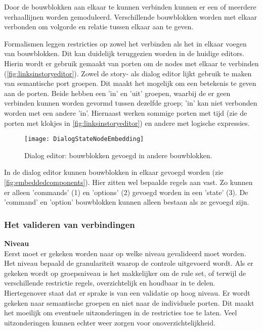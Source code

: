 Door de bouwblokken aan elkaar te kunnen verbinden kunnen er een of meerdere verhaallijnen worden gemoduleerd. Verschillende bouwblokken worden met elkaar verbonden om volgorde en relatie tussen elkaar aan te geven. 

Formalismen leggen restricties op zowel het verbinden als het in elkaar voegen van bouwblokken. Dit kan duidelijk teruggezien worden in de huidige editors. Hierin wordt er gebruik gemaakt van porten om de nodes met elkaar te verbinden (\autoref{fig:linksinstoryeditor}). Zowel de story- als dialog editor lijkt gebruik te maken van semantische port groepen. Dit maakt het mogelijk om een betekenis te geven aan de porten. Beide hebben een 'in' en 'uit' groepen, waarbij de er geen verbinden kunnen worden gevormd tussen dezelfde groep; 'in' kan niet verbonden worden met een andere 'in'. Hiernaast werken sommige porten met tijd (zie de porten met klokjes in \autoref{fig:linksinstoryeditor}) en andere met logische expressies.

\begin{wrapfigure}{r}{0.32\textwidth}
    \centering    
    \texttt{[image: DialogStateNodeEmbedding]}
    \caption{Dialog editor: bouwblokken gevoegd in andere bouwblokken.}
    \label{fig:embeddedcomponents}
\end{wrapfigure}

In de dialog editor kunnen bouwblokken in elkaar gevoegd worden (zie \autoref{fig:embeddedcomponents}). Hier zitten wel bepaalde regels aan vast. Zo kunnen er alleen 'commands' (1) en 'options' (2) gevoegd worden in een 'state' (3). De 'command' en 'option' bouwblokken kunnen alleen bestaan als ze gevoegd zijn.

\subsubsection{Het valideren van verbindingen}
\noindent\textbf{Niveau}\\
Eerst moet er gekeken worden naar op welke niveau gevalideerd moet worden. Het niveau bepaald de granulariteit waarop de controle uitgevoerd wordt. Als er gekeken wordt op groepsniveau is het makkelijker om de rule set, of terwijl de verschillende restrictie regels, overzichtelijk en houdbaar in te delen. Hiertegenover staat dat er sprake is van een validatie op hoog niveau. Er wordt gekeken naar semantische groepen en niet naar de individuele porten. Dit maakt het moeilijk om eventuele uitzonderingen in de restricties toe te laten. Veel uitzonderingen kunnen echter weer zorgen voor onoverzichtelijkheid.

